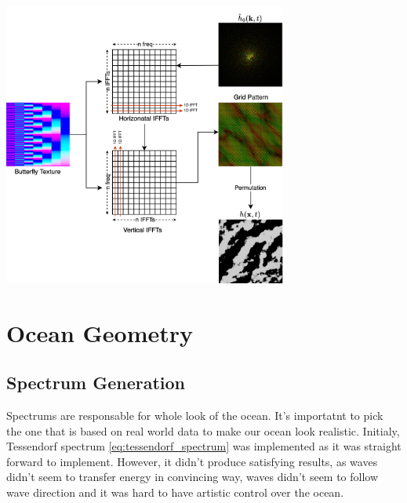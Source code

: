 \begin{minipage}{1\textwidth}
    \centering
    \includegraphics[width=0.7\textwidth]{"images/ifft_algorithm.png"}
    \label{fig:ifft_algorithm}
\end{minipage}

\section{Ocean Geometry}
\subsection{Spectrum Generation}


Spectrums are responsable for whole look of the ocean. It's importatnt to pick the one that is based on real world data to make our ocean look realistic.
Initialy, Tessendorf spectrum \ref{eq:tessendorf_spectrum} was implemented as it was straight forward to implement. However, it didn't produce satisfying results, as waves didn't seem to transfer energy in convincing way, waves didn't seem to follow wave direction and it was hard to have artistic control over the ocean.


